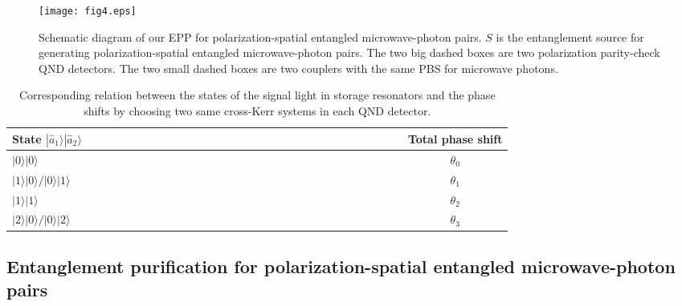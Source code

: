 \documentclass[showpacs,aps,graphicx,twocolumn]{revtex4}
\begin{document}
\begin{figure*}[!ht]%
\begin{center}
\texttt{[image: fig4.eps]}
\caption{ Schematic diagram of our EPP for polarization-spatial
entangled microwave-photon pairs. $S$ is the entanglement source for
generating polarization-spatial entangled microwave-photon pairs.
The two big dashed boxes are two  polarization parity-check QND detectors. The two
small dashed boxes are two couplers with the same PBS for microwave
photons.} \label{figeppps}
\end{center}
\end{figure*}


\begin{table}
  \begin{center}
\caption{ Corresponding relation between the states of the signal
light in storage resonators and the phase shifts by choosing two same cross-Kerr systems
in each QND detector.}
    \begin{tabular}{lccccccccccccccccccccccccccccc}
      \hline\hline
State $|\hat{a}_{1}\rangle|\hat{a}_{2}\rangle$&&&&&&&&&&&&&&&&&&&&&&&&&&&&& Total phase shift \\ \hline
$|0\rangle|0\rangle$ &&&&&&&&&&&&&&&&&&&&&&&&&&&&& $\theta_{0}$ \\
$|1\rangle|0\rangle/|0\rangle|1\rangle$ &&&&&&&&&&&&&&&&&&&&&&&&&&&&& $\theta_{1}$ \\
$|1\rangle|1\rangle$ &&&&&&&&&&&&&&&&&&&&&&&&&&&&& $\theta_{2}$ \\
$|2\rangle|0\rangle/|0\rangle|2\rangle$ &&&&&&&&&&&&&&&&&&&&&&&&&&&&& $\theta_{3}$
\\ \hline\hline
    \end{tabular}\label{Tab3}
  \end{center}
\end{table}



\subsection{Entanglement purification for polarization-spatial entangled microwave-photon pairs}
\label{sec32}
\end{document}
